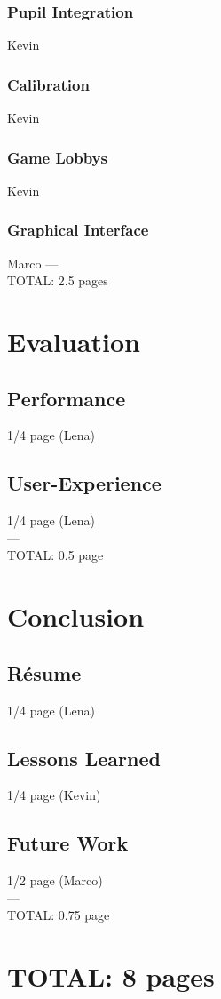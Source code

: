 \documentclass{sigchi}
\begin{document}
\subsubsection{Pupil Integration} Kevin
\subsubsection{Calibration} Kevin
\subsubsection{Game Lobbys} Kevin
\subsubsection{Graphical Interface} Marco
---\\
TOTAL: 2.5 pages


\section{Evaluation}
\subsection{Performance}
1/4 page (Lena)
\subsection{User-Experience}
1/4 page (Lena)\\
---\\
TOTAL: 0.5 page

\section{Conclusion}
\subsection{Résume}
1/4 page (Lena)
\subsection{Lessons Learned}
1/4 page (Kevin)
\subsection{Future Work}
1/2 page (Marco)\\
---\\
TOTAL: 0.75 page

\section{TOTAL: 8 pages}

\balance{}




\end{document}
